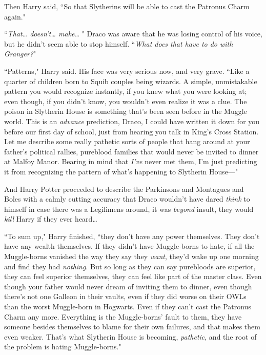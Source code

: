 Then Harry said, ``So that Slytherins will be able to cast the Patronus Charm again."

``\emph{That{\ldots} doesn't{\ldots} make{\ldots} }" Draco was aware that he was losing control of his voice, but he didn't seem able to stop himself. ``\emph{What does that have to do with Granger?}"

``Patterns," Harry said. His face was very serious now, and very grave. ``Like a quarter of children born to Squib couples being wizards. A simple, unmistakable pattern you would recognize instantly, if you knew what you were looking at; even though, if you didn't know, you wouldn't even realize it was a clue. The poison in Slytherin House is something that's been seen before in the Muggle world. This is an \emph{advance} prediction, Draco, I could have written it down for you before our first day of school, just from hearing you talk in King's Cross Station. Let me describe some really pathetic sorts of people that hang around at your father's political rallies, pureblood families that would never be invited to dinner at Malfoy Manor. Bearing in mind that \emph{I've} never met them, I'm just predicting it from recognizing the pattern of what's happening to Slytherin House—"

And Harry Potter proceeded to describe the Parkinsons and Montagues and Boles with a calmly cutting accuracy that Draco wouldn't have dared \emph{think} to himself in case there was a Legilimens around, it was \emph{beyond} insult, they would \emph{kill} Harry if they ever heard{\ldots}

``To sum up," Harry finished, ``they don't have any power themselves. They don't have any wealth themselves. If they didn't have Muggle-borns to hate, if all the Muggle-borns vanished the way they say they \emph{want}, they'd wake up one morning and find they had \emph{nothing}. But so long as they can say purebloods are superior, they can feel superior themselves, they can feel like part of the master class. Even though your father would never dream of inviting them to dinner, even though there's not one Galleon in their vaults, even if they did worse on their OWLs than the worst Muggle-born in Hogwarts. Even if they can't cast the Patronus Charm any more. Everything is the Muggle-borns' fault to them, they have someone besides themselves to blame for their own failures, and that makes them even weaker. That's what Slytherin House is becoming, \emph{pathetic}, and the root of the problem is hating Muggle-borns."

